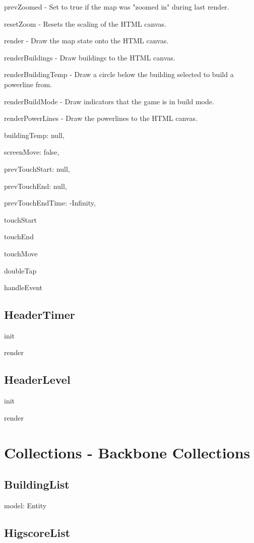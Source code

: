 	prevZoomed - Set to true if the map was "zoomed in" during last render.

	resetZoom - Resets the scaling of the HTML canvas.

	render - Draw the map state onto the HTML canvas.

	renderBuildings - Draw buildings to the HTML canvas.

	renderBuildingTemp - Draw a circle below the building selected to build a powerline from.

	renderBuildMode - Draw indicators that the game is in build mode.

	renderPowerLines - Draw the powerlines to the HTML canvas.

	buildingTemp: null,

  	screenMove: false,

  	prevTouchStart: null,

 	prevTouchEnd: null,

  	prevTouchEndTime: -Infinity,

  	touchStart

  	touchEnd

  	touchMove

  	doubleTap

  	handleEvent

\subsection*{HeaderTimer}

	init

	render

\subsection*{HeaderLevel}

	init

	render

\clearpage

\section{Collections - Backbone Collections}
	
\subsection*{BuildingList}

	model: Entity

\subsection*{HigscoreList}
	
